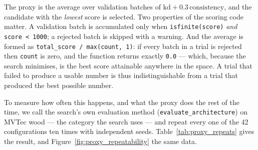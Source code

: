 The proxy is the average over validation batches of
$\mathrm{kd} + 0.3\,\mathrm{consistency}$, and the candidate with the
\emph{lowest} score is selected. Two properties of the scoring code matter.
A validation batch is accumulated only when \texttt{isfinite(score)} \emph{and}
\texttt{score < 1000}; a rejected batch is skipped with a warning. And the average
is formed as \texttt{total\_score / max(count, 1)}: if every batch in a trial is
rejected then \texttt{count} is zero, and the function returns exactly
\texttt{0.0} --- which, because the search minimises, is the best score attainable
anywhere in the space. A trial that failed to produce a usable number is thus
indistinguishable from a trial that produced the best possible number.

To measure how often this happens, and what the proxy does the rest of the time,
we call the search's own evaluation method (\texttt{evaluate\_architecture}) on
MVTec wood --- the category the search uses --- and repeat every one of the 42
configurations ten times with independent seeds. Table~\ref{tab:proxy_repeats}
gives the result, and Figure~\ref{fig:proxy_repeatability} the same data.

\begin{table}[t]
\centering
\caption{Proxy repeatability, condensed. The search's own evaluation method is
called ten times for each of the 42 configurations on MVTec wood (420
evaluations). ``Zero'' is the fraction of repeats returning exactly $0.0$; ``CV''
is the within-configuration coefficient of variation, pooled over each backbone's
three dimensions. The two collapse-prone backbones are shown individually; of the
remaining twelve not one degenerate trial occurred in any repeat, and their pooled
medians span $7.538$--$7.971$ with CV between $2.2\%$ and $12.1\%$. Their
per-backbone values are released with the code.}
\label{tab:proxy_repeats}

\end{table}

